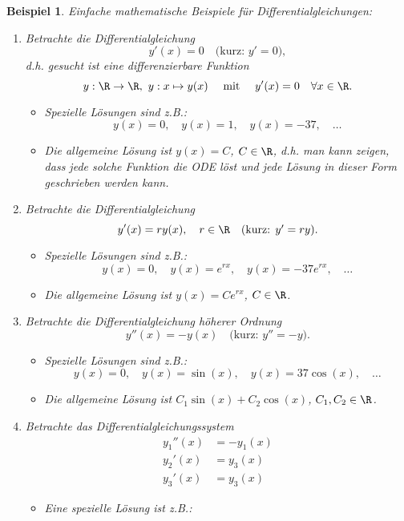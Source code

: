 \documentclass[
]{mycourse}
\theoremstyle{mythm}
\newtheorem{beispiel}[theorem]{Beispiel}
\theoremstyle{break}
\begin{document}
\begin{beispiel}\label{bsp:ODE_math}
Einfache mathematische Beispiele für Differentialgleichungen:

\begin{enumerate}
\item[(a)] Betrachte die Differentialgleichung 
\[
y'(x)=0 \quad \mbox{(kurz: $y'=0$)},
\]
d.h. gesucht ist eine differenzierbare Funktion 
\[
y: \R\to \R,\ y: x \mapsto y(x)\quad \mbox{ mit } \quad y'(x)=0 \quad \forall x\in \R.
\]
\begin{itemize}
\item \emph{Spezielle} Lösungen sind z.B.: 
\[
y(x)=0, \quad  y(x)=1, \quad y(x)=-37, \quad \ldots
\]
\item Die \emph{allgemeine} Lösung ist $y(x)=C$, $C\in \R$, d.h. man kann zeigen, dass jede solche Funktion
die ODE löst und jede Lösung in dieser Form geschrieben werden kann.
\end{itemize}
%
\item[(b)] Betrachte die Differentialgleichung 
\[
y'(x)= r y(x), \quad r\in \R \quad \mbox{(kurz: $y'=r y$)}.
\]
\begin{itemize}
\item \emph{Spezielle} Lösungen sind z.B.: 
\[
y(x)=0, \quad y(x)=e^{rx}, \quad y(x)=-37e^{rx}, \quad \ldots
\]
\item Die \emph{allgemeine} Lösung ist $y(x)=Ce^{rx}$, $C\in \R$.
\end{itemize}
%
\item[(c)] 
Betrachte die Differentialgleichung \emph{höherer Ordnung} 
\[
y''(x)=-y(x) \quad \mbox{(kurz: $y''=-y$)}.
\]
\begin{itemize}
\item \emph{Spezielle} Lösungen sind z.B.: 
\[
y(x)=0, \quad y(x)=\sin (x), \quad y(x)=37\cos (x), \quad \ldots
\]
\item Die \emph{allgemeine} Lösung ist $C_1 \sin(x) + C_2 \cos(x)$, \quad $C_1,C_2\in \R$.
\end{itemize}
%
\item[(d)] 
Betrachte das \emph{Differentialgleichungssystem} 
\begin{align*}
y_1''(x)& = -y_1(x)\\
y_2'(x)& = y_3(x)\\
y_3'(x)& = y_3(x)
\end{align*}
\begin{itemize}
\item Eine \emph{spezielle} Lösung ist z.B.: 
\begin{align*}

\end{align*}
\end{itemize}
\end{enumerate}
\end{beispiel}
\end{document}
